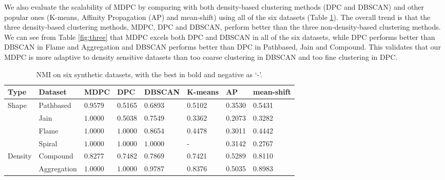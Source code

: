 \documentclass{llncs}
\begin{document}
We also evaluate the scalability of MDPC by comparing with both density-based clustering methods (DPC and DBSCAN) and other popular ones (K-means, Affinity Propagation (AP) and mean-shift) using all of the six datasets (Table \ref{tab:synthetic}). The overall trend is that the three density-based clustering methods, MDPC, DPC and DBSCAN, perform better than the three non-density-based clustering methods. We can see from Table \ref{fig:three} that MDPC excels both DPC and DBSCAN in all of the six datasets, while DPC performs better than DBSCAN in Flame and Aggregation and DBSCAN performs better than DPC in Pathbased, Jain and Compound. This validates that our MDPC is more adaptive to density sensitive datasets than too coarse clustering in DBSCAN and too fine clustering in DPC. 
\begin{table}
\vspace*{-.4cm}
\caption{NMI on six synthetic datasets, with the best in bold and negative as `-'. }
\begin{center}
\begin{tabular}{l|l|l|l|l|l|l|l}
\hline Type &Dataset & MDPC& DPC & DBSCAN & K-means & AP & mean-shift\\
\hline \multirow{4}{*}{Shape} &Pathbased & $\bm{0.9579}$ & 0.5165 & 0.6893 & 0.5102 & 0.3530 & 0.5431\\
&Jain & $\bm{1.0000}$ & 0.5038 & 0.7549 & 0.3362 & 0.2073 & 0.3282\\
&Flame & $\bm{1.0000}$ & $\bm{1.0000}$ & 0.8654 & 0.4478 & 0.3011 & 0.4442\\
&Spiral & $\bm{1.0000}$ & $\bm{1.0000}$ & $\bm{1.0000}$ & - & 0.3142 & 0.2767\\
\hline \multirow{2}{*}{Density} &Compound & $\bm{0.8277}$ & 0.7482 & 0.7869 & 0.7421 & 0.5289 & 0.8110\\
&Aggregation & $\bm{1.0000}$ & $\bm{1.0000}$ & 0.9787 & 0.8376 & 0.5035 & 0.8983\\
\hline
\end{tabular}
\end{center}
\label{tab:synthetic}
\end{table}
%
\end{document}
